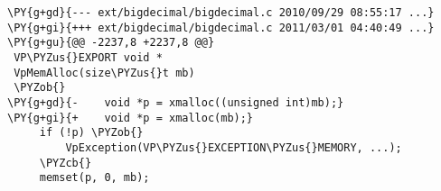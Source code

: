 \begin{Verbatim}[commandchars=\\\{\},codes={\catcode`\$=3\catcode`\^=7\catcode`\_=8}]
\PY{g+gd}{--- ext/bigdecimal/bigdecimal.c 2010/09/29 08:55:17 ...}
\PY{g+gi}{+++ ext/bigdecimal/bigdecimal.c 2011/03/01 04:40:49 ...}
\PY{g+gu}{@@ -2237,8 +2237,8 @@}
 VP\PYZus{}EXPORT void *
 VpMemAlloc(size\PYZus{}t mb)
 \PYZob{}
\PY{g+gd}{-    void *p = xmalloc((unsigned int)mb);}
\PY{g+gi}{+    void *p = xmalloc(mb);}
     if (!p) \PYZob{}
         VpException(VP\PYZus{}EXCEPTION\PYZus{}MEMORY, ...);
     \PYZcb{}
     memset(p, 0, mb);
\end{Verbatim}
